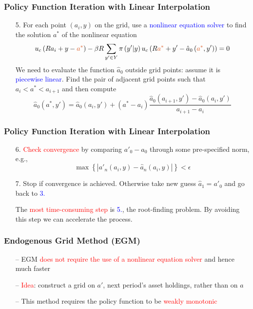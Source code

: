 \documentclass[aspectratio=169, 11pt]{beamer}
\begin{document}
\begin{frame}
\frametitle{Policy Function Iteration with Linear Interpolation}
  \begin{itemize}
    \item[5.] For each point $\left(a_{i},y\right)$ on the grid, use a \textcolor{blue}{nonlinear equation solver} to find the solution $a^{*}$ of the nonlinear equation
    \[
      u_{c}\left(Ra_{i}+y-\textcolor{red}{a^{*}}\right)-\beta R\sum_{y'\in Y}\pi\left(y'|y\right)u_{c}\left(R\textcolor{red}{a^{*}}+y'-\hat{a}_{0}\left(\textcolor{red}{a^{*}},y'\right)\right)=0
    \]
    We need to evaluate the function $\hat{a}_{0}$ outside grid points: assume it is \textcolor{blue}{piecewise linear}. Find the pair of adjacent grid points such that $a_{i}<a^{*}<a_{i+1}$ and then compute
    \[
      \hat{a}_{0}\left(a^{*},y'\right)=\hat{a}_{0}\left(a_{i},y'\right)+\left(a^{*}-a_{i}\right)\frac{\hat{a}_{0}\left(a_{i+1},y'\right)-\hat{a}_{0}\left(a_{i},y'\right)}{a_{i+1}-a_{i}}
    \]
  \end{itemize}
\end{frame}

\begin{frame}
\frametitle{Policy Function Iteration with Linear Interpolation}
  \begin{itemize}
    \item[6.] \textcolor{red}{Check convergence} by comparing $a'_{0}-\hat{a}_{0}$ through some pre-specified norm, e.g.,
    \[
      \max\left\{ \left|a'_{n}\left(a_{i},y\right)-\hat{a}_{n}\left(a_{i},y\right)\right|\right\} <\epsilon
    \]
    \item[7.] Stop if convergence is achieved. Otherwise take new guess $\hat{a}_{1}=a'_{0}$ and go back to \textcolor{blue}{3.}

    \bigskip
    The \textcolor{red}{most time-consuming step} is \textcolor{blue}{5.}, the root-finding problem. By avoiding this step we can accelerate the process.
  \end{itemize}
\end{frame}

\begin{frame}
\frametitle{Endogenous Grid Method (EGM)}
  \begin{itemize}
    \item[--] EGM \textcolor{red}{does not require the use of a nonlinear equation solver} and hence much faster
    \bigskip
    \item[--] \textcolor{red}{Idea}: construct a grid on $a'$, next period's asset holdings, rather than on $a$
    \bigskip
    \item[--] This method requires the policy function to be \textcolor{red}{weakly monotonic}
  \end{itemize}
\end{frame}
\end{document}
